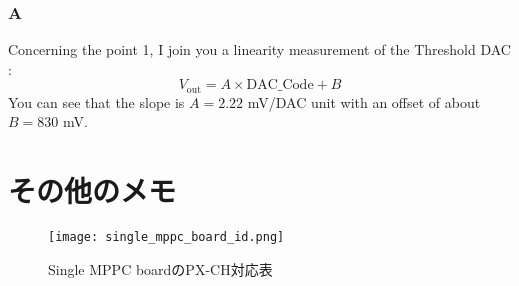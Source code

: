 \subsubsection*{A} 
Concerning the point 1, I join you a linearity measurement of the Threshold DAC :
\[ V_{\mathrm{out}} = A \times \mathrm{DAC\_Code} + B \]
You can see that the slope is $A = 2.22$ mV/DAC unit with an offset of about $B = 830$ mV.


\newpage
\section{その他のメモ}

\begin{figure}[H]
\begin{center}
\texttt{[image: single\_mppc\_board\_id.png]}
\end{center}
\caption{Single MPPC boardのPX-CH対応表}
\label{fig:}
\end{figure}

